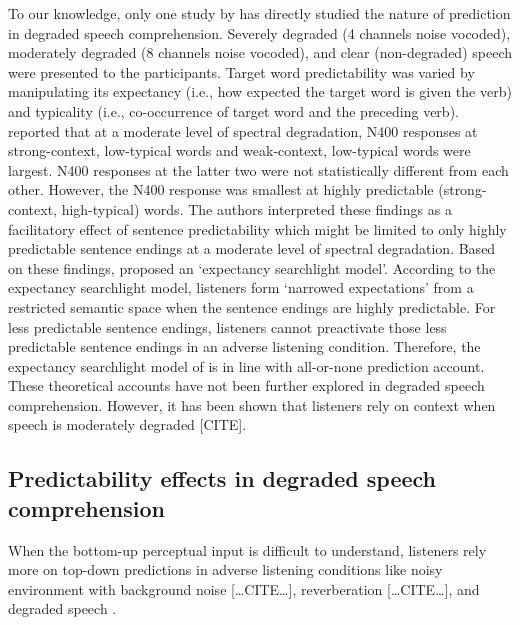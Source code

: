 \documentclass[a4paper, nobind]{templates/ociamthesis}
\begin{document}
To our knowledge, only one study by \textcite{Strauss2013} has directly studied the nature of prediction in degraded speech comprehension.
Severely degraded (4 channels noise vocoded), moderately degraded (8 channels noise vocoded), and clear (non-degraded) speech were presented to the participants.
Target word predictability was varied by manipulating its expectancy (i.e., how expected the target word is given the verb) and typicality (i.e., co-occurrence of target word and the preceding verb).
\textcite{Strauss2013} reported that at a moderate level of spectral degradation, N400 responses at strong-context, low-typical words and weak-context, low-typical words were largest.
N400 responses at the latter two were not statistically different from each other.
However, the N400 response was smallest at highly predictable (strong-context, high-typical) words.
The authors interpreted these findings as a facilitatory effect of sentence predictability which might be limited to only highly predictable sentence endings at a moderate level of spectral degradation.
Based on these findings, \textcite{Strauss2013} proposed an `expectancy searchlight model'.
According to the expectancy searchlight model, listeners form `narrowed expectations' from a restricted semantic space when the sentence endings are highly predictable.
For less predictable sentence endings, listeners cannot preactivate those less predictable sentence endings in an adverse listening condition.
Therefore, the expectancy searchlight model of \textcite{Strauss2013} is in line with all-or-none prediction account.
These theoretical accounts have not been further explored in degraded speech comprehension.
However, it has been shown that listeners rely on context when speech is moderately degraded {[}CITE{]}.

\hypertarget{predictability-effects-in-degraded-speech-comprehension}{%
\subsection{Predictability effects in degraded speech comprehension}\label{predictability-effects-in-degraded-speech-comprehension}}

When the bottom-up perceptual input is difficult to understand, listeners rely more on top-down predictions in adverse listening conditions like noisy environment with background noise {[}\ldots CITE\ldots{]}, reverberation {[}\ldots CITE\ldots{]}, and degraded speech \autocites[e.g.,][]{Sheldon2008a,Corps2020}.
\end{document}
